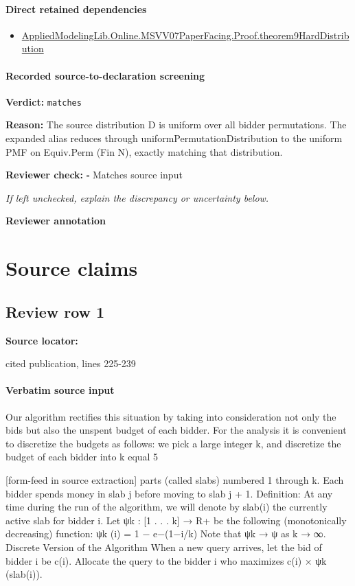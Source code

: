 \documentclass[10pt]{article}
\newcommand{\reviewerbox}{%
  \par\noindent\fbox{\parbox{0.96\linewidth}{\rule{0pt}{0.38in}}}\par
}
\newcommand{\reviewmatch}[1]{%
  \par\noindent\textbf{Reviewer check:} $\square$\; #1\par
  \noindent\emph{If left unchecked, explain the discrepancy or uncertainty below.}\par
}
\begin{document}
\paragraph{Direct retained dependencies}
\begin{itemize}\raggedright
\item \hyperlink{governing-declaration-16f1602d8b7aebd0}{Applied\allowbreak{}Modeling\allowbreak{}Lib.\allowbreak{}Online.\allowbreak{}MSVV07\allowbreak{}Paper\allowbreak{}Facing.\allowbreak{}Proof.\allowbreak{}theorem9\allowbreak{}Hard\allowbreak{}Distribution}
\end{itemize}
\paragraph{Recorded source-to-declaration screening}
\textbf{Verdict:} \texttt{matches}
\\
{\raggedright
\textbf{Reason:} The source distribution D is uniform over all bidder permutations.\allowbreak{} The expanded alias reduces through uniformPermutationDistribution to the uniform PMF on Equiv.\allowbreak{}Perm (Fin N), exactly matching that distribution.\allowbreak{}
\par}
\reviewmatch{Matches source input}
\noindent\textbf{Reviewer annotation}\par
\reviewerbox

\clearpage
\hypertarget{source-claim-0dd63ef69d9aa551}{}
\hypertarget{source-section-f10b5f68e4acf3dc}{}
\section*{Source claims}
\subsection*{Review row 1}
\textbf{Source locator:} {\footnotesize\raggedright cited publication, lines 225-\allowbreak{}239\par}
\paragraph{Verbatim source input}
\begin{ReviewVerbatim}
Our algorithm rectifies this situation by taking into consideration not only the bids but also
the unspent budget of each bidder. For the analysis it is convenient to discretize the budgets
as follows: we pick a large integer k, and discretize the budget of each bidder into k equal
5


[form-feed in source extraction]
parts (called slabs) numbered 1 through k. Each bidder spends money in slab j before moving
to slab j + 1.
Definition: At any time during the run of the algorithm, we will denote by slab(i) the
currently active slab for bidder i.
Let ψk : [1 . . . k] → R+ be the following (monotonically decreasing) function:
ψk (i) = 1 − e−(1−i/k)
Note that ψk → ψ as k → ∞.
Discrete Version of the Algorithm
When a new query arrives, let the bid of bidder i be c(i). Allocate the query to the
bidder i who maximizes c(i) × ψk (slab(i)).
\end{ReviewVerbatim}
\end{document}
